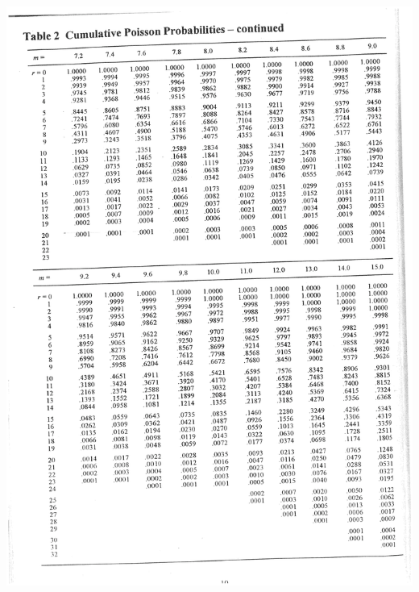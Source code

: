 \documentclass[12pt]{article}
\begin{document}
\begin{adjustwidth}{-1cm}{0cm}
\includegraphics[width=1.1\textwidth, trim = 1cm 1cm 1cm 1cm, clip]{mdpois3}
\end{adjustwidth}

\newpage
\end{document}
